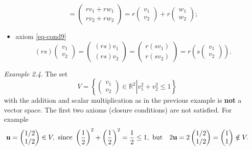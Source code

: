 \documentclass[
  letterpaper,
  DIV=11,
  numbers=noendperiod]{scrartcl}
\theoremstyle{remark}
\begin{document}
\begin{itemize}
\[    =\begin{pmatrix}   rv_1+rw_1 \\ rv_2+rw_2  \end{pmatrix} 
    =r \begin{pmatrix}   v_1 \\ v_2  \end{pmatrix} +r \begin{pmatrix}   w_1 \\ w_2  \end{pmatrix}; \]
\item
  axiom \ref{eq-cond9}
  \[(rs) \begin{pmatrix}   v_1 \\ v_2  \end{pmatrix} 
    = \begin{pmatrix}   (rs)v_1 \\ (rs)v_2  \end{pmatrix} 
    =\begin{pmatrix}   r(sv_1) \\ r(sv_2)  \end{pmatrix} 
    =r \left(s \begin{pmatrix}   v_1 \\ v_2  \end{pmatrix} \right).\]
\end{itemize}

\emph{Example 2.4}. The set
\[V= \left\{ \left.  \begin{pmatrix}   v_{1}\\ v_{2}  \end{pmatrix}  \in \mathbb{R}^2 \right|  v_1^2+v_2^2 \le 1\right\}\]
with the addition and scalar multiplication as in the previous example
is \textbf{not} a vector space. The first two axioms (closure
conditions) are not satisfied. For example
\[{\bf u}=  \begin{pmatrix}   1/2\\ 1/2  \end{pmatrix}  \in V, \ \mbox{since} \    \left(\frac{1}{2}\right)^2+\left(\frac{1}{2}\right)^2 = \frac{1}{2} \le 1, \  \mbox{but} \quad  2{\bf u}= 2  \begin{pmatrix}   1/2\\ 1/2  \end{pmatrix}  = \begin{pmatrix}   1\\ 1  \end{pmatrix}   \notin V.\]
\end{document}
